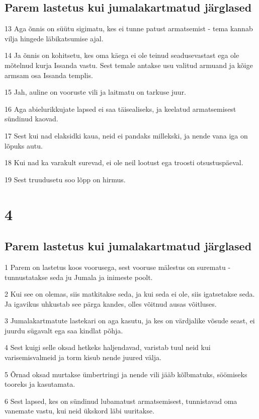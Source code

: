 \section*{Parem lastetus kui jumalakartmatud järglased}

\par 13 Aga õnnis on süütu sigimatu, kes ei tunne patust armatsemist - tema kannab vilja hingede läbikatsumise ajal.
\par 14 Ja õnnis on kohitsetu, kes oma käega ei ole teinud seadusevastast ega ole mõtelnud kurja Issanda vastu. Sest temale antakse usu valitud armuand ja kõige armsam osa Issanda templis.
\par 15 Jah, auline on vooruste vili ja laitmatu on tarkuse juur.
\par 16 Aga abielurikkujate lapsed ei saa täisealiseks, ja keelatud armatsemisest sündinud kaovad.
\par 17 Sest kui nad elaksidki kaua, neid ei pandaks millekski, ja nende vana iga on lõpuks autu.
\par 18 Kui nad ka varakult surevad, ei ole neil lootust ega troosti otsustuspäeval.
\par 19 Sest truudusetu soo lõpp on hirmus. 

\chapter{4}

\section*{Parem lastetus kui jumalakartmatud järglased}

\par 1 Parem on lastetus koos voorusega, sest vooruse mälestus on surematu - tunnustatakse seda ju Jumala ja inimeste poolt.
\par 2 Kui see on olemas, siis matkitakse seda, ja kui seda ei ole, siis igatsetakse seda. Ja igavikus uhkustab see pärga kandes, olles võitnud ausas võitluses.
\par 3 Jumalakartmatute lastekari on aga kasutu, ja kes on värdjalike võsude seast, ei juurdu sügavalt ega saa kindlat põhja.
\par 4 Sest kuigi selle oksad hetkeks haljendavad, varistab tuul neid kui varisemisvalmeid ja torm kisub nende juured välja.
\par 5 Õrnad oksad murtakse ümbertringi ja nende vili jääb kõlbmatuks, söömiseks tooreks ja kasutamata.
\par 6 Sest lapsed, kes on sündinud lubamatust armatsemisest, tunnistavad oma vanemate vastu, kui neid ükskord läbi uuritakse. 

